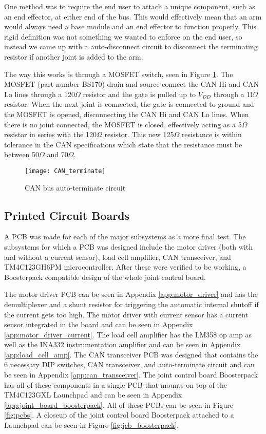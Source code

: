 \noindent One method was to require the end user to attach a unique component, such as an end effector, at either end of the bus. This would effectively mean that an arm would always need a base module and an end effector to function properly. This rigid definition was not something we wanted to enforce on the end user, so instead we came up with a auto-disconnect circuit to disconnect the terminating resistor if another joint is added to the arm.

\noindent The way this works is through a MOSFET switch, seen in Figure \ref{fig:can_terminate_circ}. The MOSFET (part number BS170) drain and source connect the CAN Hi and CAN Lo lines through a 120$\Omega$ resistor and the gate is pulled up to $V_{DD}$ through a 1l$\Omega$ resistor. When the next joint is connected, the gate is connected to ground and the MOSFET is opened, disconnecting the CAN Hi and CAN Lo lines. When there is no joint connected, the MOSFET is closed, effectively acting as a 5$\Omega$ resistor in series with the 120$\Omega$ resistor. This new 125$\Omega$ resistance is within tolerance in the CAN specifications which state that the resistance must be between 50$\Omega$ and 70$\Omega$.

\begin{figure}[H]
	\centering
	\texttt{[image: CAN\_terminate]}
	\caption{CAN bus auto-terminate circuit}
	\label{fig:can_terminate_circ}
\end{figure}

\subsection{Printed Circuit Boards}
A PCB was made for each of the major subsystems as a more final test. The subsystems for which a PCB was designed include the motor driver (both with and without a current sensor), load cell amplifier, CAN transceiver, and TM4C123GH6PM microcontroller. After these were verified to be working, a Boosterpack compatible design of the whole joint control board.

\noindent The motor driver PCB can be seen in Appendix \ref{app:motor_driver} and has the demultiplexer and a shunt resistor for triggering the automatic internal shutoff if the current gets too high. The motor driver with current sensor has a current sensor integrated in the board and can be seen in Appendix \ref{app:motor_driver_current}. The load cell amplifier has the LM358 op amp as well as the INA332 instrumentation amplifier and can be seen in Appendix \ref{app:load_cell_amp}. The CAN transceiver PCB was designed that contains the 6 necessary DIP switches, CAN transceiver, and auto-terminate circuit and can be seen in Appendix \ref{app:can_transceiver}. The joint control board Boosterpack has all of these components in a single PCB that mounts on top of the TM4C123GXL Launchpad and can be seen in Appendix \ref{app:joint_board_boosterpack}. All of these PCBs can be seen in Figure \ref{fig:pcbs}. A closeup of the joint control board Boosterpack attached to a Launchpad can be seen in Figure \ref{fig:jcb_boosterpack}.

